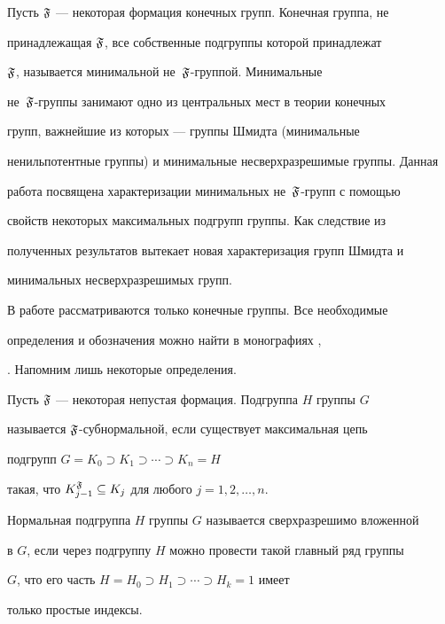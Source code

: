 \maketitle


\label{begin}





Пусть $\frak F$ --- некоторая формация конечных групп. Конечная группа, не


принадлежащая $\frak F$, все собственные подгруппы которой принадлежат


$\frak F$, называется минимальной не~$\frak F$-группой. Минимальные


не~$\frak F$-группы занимают одно из центральных мест в теории конечных


групп, важнейшие из которых --- группы Шмидта (минимальные


ненильпотентные группы) и минимальные несверхразрешимые группы. Данная


работа посвящена характеризации минимальных не~$\frak F$-групп с помощью


свойств некоторых максимальных подгрупп группы. Как следствие из


полученных результатов вытекает новая характеризация групп Шмидта и


минимальных несверхразрешимых групп.





В работе рассматриваются только конечные группы. Все необходимые


определения и обозначения можно найти в монографиях \cite{S1},


\cite{S2}. Напомним лишь некоторые определения.





\begin{defn}


Пусть $\frak F$ --- некоторая непустая формация. Подгруппа $H$ группы $G$


называется $\frak F$-субнормальной, если существует максимальная цепь


подгрупп $G=K_0\supset K_1\supset\dotsb\supset K_n=H$


такая, что $K^{\frak F}_{j-1}\subseteq K_j$ для любого $j=1,2,\dotsc,n$.


\end{defn}





\begin{defn}


Нормальная подгруппа $H$ группы $G$ называется сверхразрешимо вложенной


в $G$, если через подгруппу $H$ можно провести такой главный ряд группы


$G$, что его часть $H=H_0\supset H_1\supset\dotsb\supset H_k=1$ имеет


только простые индексы.


\end{defn}





